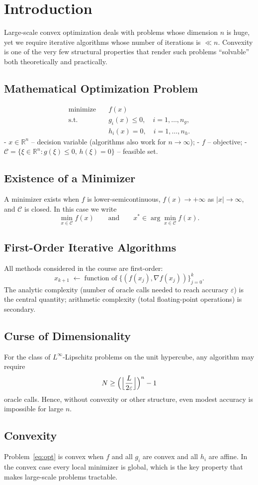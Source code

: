 \section{Introduction}

Large-scale convex optimization deals with problems whose dimension
\(n\) is huge, yet we require iterative algorithms whose number of
iterations is \(\ll n\). Convexity is one of the very few structural
properties that render such problems “solvable” both theoretically
and practically.

\subsection{Mathematical Optimization Problem}
\begin{equation}
  \begin{aligned}
    \operatorname{minimize}\quad & f(x)\\
    \text{s.t.}\quad & g_i(x)\le 0,\quad i=1,\dots,n_g,\\
    & h_i(x)=0,\quad i=1,\dots,n_h.
  \end{aligned}
  \label{eq:opt}
\end{equation}
- \(x\in\mathbb{R}^n\) – decision variable (algorithms also work for
\(n\to\infty\));
- \(f\) – objective;
- \(\mathcal{C}=\{\xi\in\mathbb{R}^n:g(\xi)\le 0,\,h(\xi)=0\}\) – feasible set.

\subsection{Existence of a Minimizer}
A minimizer exists when \(f\) is lower-semicontinuous,
\(f(x)\to+\infty\) as \(|x|\to\infty\), and \(\mathcal{C}\) is
closed. In this case we write
\[
  \min_{x\in\mathcal{C}}f(x)\qquad\text{and}\qquad
  x^*\in\arg\min_{x\in\mathcal{C}}f(x).
\]

\subsection{First-Order Iterative Algorithms}
All methods considered in the course are first-order:
\[
  x_{k+1}\;\leftarrow\;\text{function of}\;\bigl\{(f(x_j),\nabla
  f(x_j))\bigr\}_{j=0}^k.
\]
The analytic complexity (number of oracle calls needed to reach
accuracy \(\varepsilon\)) is the central quantity; arithmetic
complexity (total floating-point operations) is secondary.

\subsection{Curse of Dimensionality}
For the class of \(L^\infty\)-Lipschitz problems on the unit
hypercube, any algorithm may require
\[
  N\ge\Bigl(\Bigl\lfloor\frac{L}{2\varepsilon}\Bigr\rfloor\Bigr)^n-1
\]
oracle calls. Hence, without convexity or other structure, even
modest accuracy is impossible for large \(n\).

\subsection{Convexity}
Problem~\eqref{eq:opt} is convex when \(f\) and all \(g_i\) are
convex and all \(h_i\) are affine. In the convex case every local
minimizer is global, which is the key property that makes large-scale
problems tractable.

